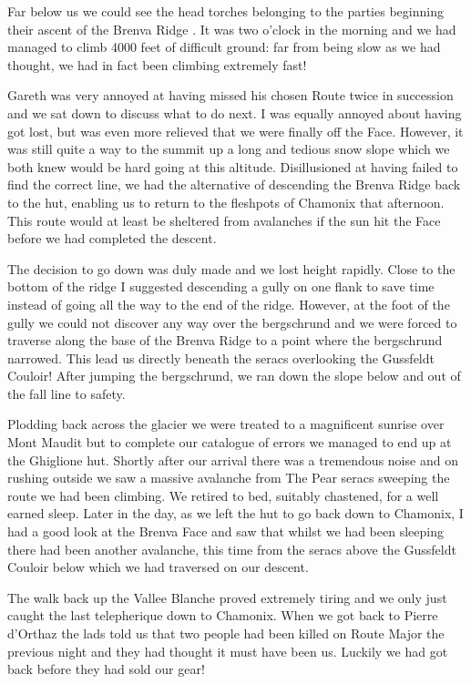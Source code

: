 \documentclass[a5paper,openany,font 10pt]{scrbook}
\begin{document}
Far below us we could see the head torches belonging to the
parties beginning their ascent of the  Brenva Ridge . It was two
o'clock in the morning and we had managed to climb 4000 feet of
difficult ground: far from being slow as we had thought, we had
in fact been climbing extremely fast!

Gareth was very annoyed at having missed his chosen Route
twice in succession and we sat down to discuss what to do next. I
was equally annoyed about having got lost, but was even more
relieved that we were finally off the Face. However, it was still
quite a way to the summit up a long and tedious snow slope which
we both knew would be hard going at this altitude. Disillusioned
at having failed to find the correct line, we had the alternative
of descending the  Brenva Ridge  back to the hut, enabling us to
return to the fleshpots of Chamonix that afternoon. This route
would at least be sheltered from avalanches if the sun hit the
Face before we had completed the descent.

The decision to go down was duly made and we lost height
rapidly. Close to the bottom of the ridge I suggested descending
a gully on one flank to save time instead of going all the way to
the end of the ridge. However, at the foot of the gully we could
not discover any way over the bergschrund and we were forced to
traverse along the base of the  Brenva Ridge  to a point where the
bergschrund narrowed. This lead us directly beneath the seracs
overlooking the Gussfeldt Couloir! After jumping the bergschrund,
we ran down the slope below and out of the fall line to safety.

Plodding back across the glacier we were treated to a
magnificent sunrise over Mont Maudit but to complete our
catalogue of errors we managed to end up at the Ghiglione hut.
Shortly after our arrival there was a tremendous noise and on
rushing outside we saw a massive avalanche from  The Pear  seracs
sweeping the route we had been climbing. We retired to bed,
suitably chastened, for a well earned sleep. Later in the day, as
we left the hut to go back down to Chamonix, I had a good look at
the Brenva Face and saw that whilst we had been sleeping there
had been another avalanche, this time from the seracs above the
Gussfeldt Couloir below which we had traversed on our descent.

The walk back up the Vallee Blanche proved extremely tiring
and we only just caught the last telepherique down to Chamonix.
When we got back to Pierre d'Orthaz the lads told us that two
people had been killed on  Route Major  the previous night and they
had thought it must have been us. Luckily we had got back before
they had sold our gear!
\end{document}
